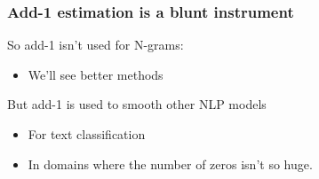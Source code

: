 \documentclass[13.5pt,aspecratio=169]{beamer}
\begin{document}
\begin{frame}
\onehalfspacing
	\frametitle{Add-1 estimation is a blunt instrument}
    {\Large So add-1 isn’t used for N-grams:}
    \begin{itemize}
        \item {\large We’ll see better methods}

    \end{itemize}
    \vspace{3em}
    {\Large But add-1 is used to smooth other NLP models}
    \begin{itemize}
        \item {\large For text classification}
        \item {\large In domains where the number of zeros isn’t so huge.}
    \end{itemize}

   
\end{frame}

\end{document}
